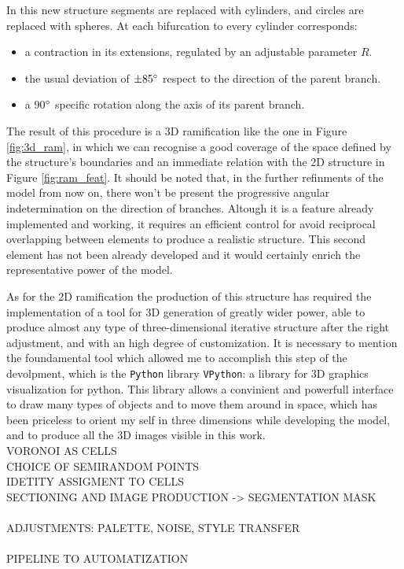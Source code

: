 In this new structure segments are replaced with cylinders, and circles are replaced with spheres. At each bifurcation to every cylinder corresponds:
\begin{itemize}
    \item a contraction in its extensions, regulated by an adjustable parameter $R$.
    \item the usual deviation of $\pm 85 \degree$ respect to the direction of the parent branch.
    \item a 90$\degree$ specific rotation along the axis of its parent branch.
\end{itemize}

The result of this procedure is a 3D ramification like the one in Figure \ref{fig:3d_ram}, in which we can recognise a good coverage of the space defined by the structure's boundaries and an immediate relation with the 2D structure in Figure \ref{fig:ram_feat}. It should be noted that, in the further refinments of the model from now on, there won't be present the progressive angular indetermination on the direction of branches. Altough it is a feature already implemented and working, it requires an efficient control for avoid reciprocal overlapping between elements to produce a realistic structure. This second element has not been already developed and it would certainly enrich the representative power of the model.

As for the 2D ramification the production of this structure has required the implementation of a tool for 3D generation of greatly wider power, able to produce almost any type of three-dimensional iterative structure after the right adjustment, and with an high degree of customization. It is necessary to mention the foundamental tool which allowed me to accomplish this step of the devolpment, which is the \texttt{Python} library \texttt{VPython}: a library for 3D graphics visualization for python. This library allows a convinient and powerfull interface to draw many types of objects and to move them around in space, which has been priceless to orient my self in three dimensions while developing the model, and to produce all the 3D images visible in this work.
\\
VORONOI AS CELLS\\
CHOICE OF SEMIRANDOM POINTS\\
IDETITY ASSIGMENT TO CELLS\\
SECTIONING AND IMAGE PRODUCTION -> SEGMENTATION MASK\\
\\
ADJUSTMENTS: PALETTE, NOISE, STYLE TRANSFER\\
\\
PIPELINE TO AUTOMATIZATION\\
\clearpage

